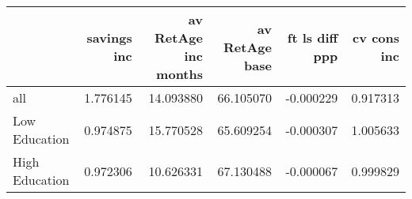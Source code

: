 \begin{tabular}{lrrrrr}
\toprule
 & savings inc & av RetAge inc months & av RetAge base & ft ls diff ppp & cv cons inc \\
\midrule
all & 1.776145 & 14.093880 & 66.105070 & -0.000229 & 0.917313 \\
Low Education & 0.974875 & 15.770528 & 65.609254 & -0.000307 & 1.005633 \\
High Education & 0.972306 & 10.626331 & 67.130488 & -0.000067 & 0.999829 \\
\bottomrule
\end{tabular}
